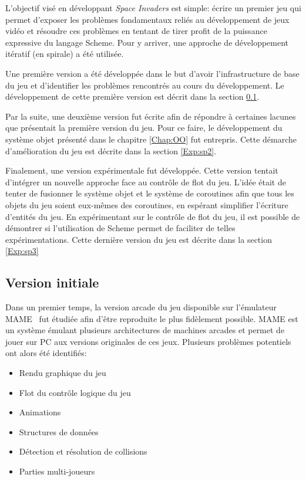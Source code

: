 \documentclass[12pt,twoside,letterpaper,francais]{book}
\begin{document}
L'objectif visé en développant \textit{Space Invaders} est simple: écrire un premier jeu
qui permet d'exposer les problèmes fondamentaux reliés au
dévelop\-pement de jeux vidéo et résoudre ces problèmes en tentant de
tirer profit de la puissance expressive du langage Scheme. Pour y
arriver, une approche de dévelop\-pement itératif (en spirale) a été
utilisée.

Une première version a été développée dans le but d'avoir
l'infrastructure de base du jeu et d'identifier les problèmes
rencontrés au cours du dévelop\-pement. Le dévelop\-pement de cette
première version est décrit dans la section \ref{Exp:sp1}.

Par la suite, une deuxième version fut écrite afin de répondre à
certaines lacunes que présentait la première version du jeu. Pour ce
faire, le dévelop\-pement du système objet présenté dans le chapitre
\ref{Chap:OO} fut entrepris. Cette démarche d'amélioration du jeu est
décrite dans la section \ref{Exp:sp2}.

Finalement, une version expérimentale fut développée. Cette version
tentait d'intégrer un nouvelle approche face au contrôle de flot du
jeu. L'idée était de tenter de fusionner le système objet et le
système de coroutines afin que tous les objets du jeu soient eux-mêmes
des coroutines, en espérant simplifier l'écriture d'entités du jeu. En
expérimentant sur le contrôle de flot du jeu, il est possible de
démontrer si l'utilisation de Scheme permet de faciliter de
telles expérimentations. Cette dernière version du jeu est décrite
dans la section \ref{Exp:sp3}


\FloatBarrier
\subsection{Version initiale} \label{Exp:sp1}
Dans un premier temps, la version arcade du jeu disponible sur
l'émulateur MAME~\cite{MAME} fut étudiée afin d'être reproduite le
plus fidèlement possible. MAME est un système émulant plusieurs
architectures de machines arcades et permet de jouer sur PC aux
versions originales de ces jeux. Plusieurs problèmes potentiels ont
alors été identifiés:

\begin{itemize}
\item Rendu graphique du jeu
\item Flot du contrôle logique du jeu
\item Animations
\item Structures de données
\item Détection et résolution de collisions
\item Parties multi-joueurs
\end{itemize}
\end{document}
